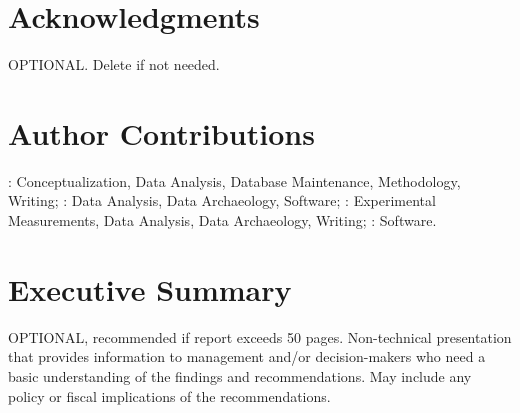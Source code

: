 \begin{titlepage}
\section*{Acknowledgments}
OPTIONAL. Delete if not needed.
\section*{Author Contributions}
\textbf{\authorone}: Conceptualization, Data Analysis, Database Maintenance, Methodology, Writing; \textbf{\authortwo}: Data Analysis, Data Archaeology, Software; \textbf{\authorthree}:  Experimental Measurements, Data Analysis, Data Archaeology, Writing; \textbf{\authorfour}:  Software.
\end{titlepage}
\pagestyle{fancy}
\renewcommand{\headrulewidth}{0pt}
  \fancyhead{}
  \fancyhead[l]{\small \pubnumber \\ 
	\small \pubmonth~\pubyear \\}
\section*{Executive Summary}
\label{sec:es}
\normalsize OPTIONAL, recommended if report exceeds 50 pages. Non-technical presentation that provides information to management and/or decision-makers who need a basic understanding of the findings and recommendations. May include any policy or fiscal implications of the recommendations.


\clearpage

\clearpage

\clearpage

%
%


